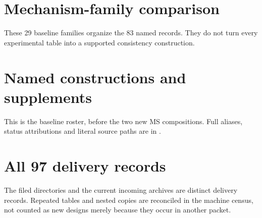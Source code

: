 \documentclass[11pt]{article}
\begin{document}
\section{Mechanism-family comparison}
\label{app:families}
These 29 baseline families organize the 83 named records. They do not
turn every experimental table into a supported consistency construction.

\clearpage
\section{Named constructions and supplements}
\label{app:named}
This is the baseline roster, before the two new MS compositions.
Full aliases, status attributions and literal source paths are in
.

\clearpage
\section{All 97 delivery records}
\label{app:packets}
The filed directories and the current incoming archives are distinct
delivery records. Repeated tables and nested copies are reconciled in
the machine census, not counted as new designs merely because they occur
in another packet.

\end{document}
